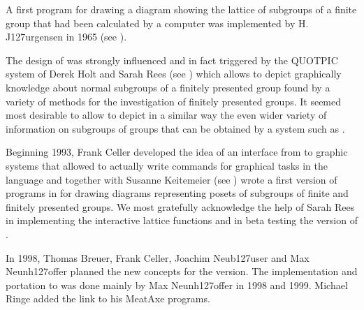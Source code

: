 
A first program for drawing a diagram showing the lattice of subgroups
of  a finite  group  that  had  been   calculated by  a  computer  was
implemented by H. J\accent127urgensen in 1965 (see \cite{FJ65}).

The  design of {\XGAP} was strongly  influenced and  in fact triggered by
the  QUOTPIC system of  Derek Holt  and  Sarah Rees (see \cite{HR91})
%
which allows to depict graphically knowledge about normal subgroups of
a finitely presented group found by a variety of methods for the
investigation of finitely presented groups.  It seemed most desirable
to allow to depict in a similar way the even wider variety of
information on subgroups of groups that can be obtained by a system
such as {\GAP}.

Beginning 1993,  Frank Celler developed the  idea of an interface from
{\GAP}   to graphic systems that  allowed  to actually write commands for
graphical   tasks  in  the {\GAP}  language   and  together with  Susanne
Keitemeier  (see \cite{SK95}) wrote a first version
of   programs in {\XGAP}  for   drawing diagrams  representing posets  of
subgroups of finite and finitely presented groups.  We most gratefully
acknowledge  the  help of  Sarah Rees in  implementing the interactive
lattice functions and in beta testing the {} version of {\XGAP}.

In 1998, Thomas Breuer, Frank Celler, Joachim Neub\accent127user and Max
Neunh\accent127offer planned the new concepts for the {}
version. The implementation and portation to {} was done mainly by Max
Neunh\accent127offer in 1998 and 1999. Michael Ringe added the link to his
MeatAxe programs.

